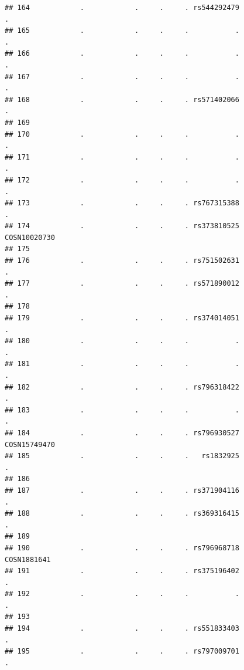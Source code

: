 \documentclass[
]{article}
\begin{document}
\begin{verbatim}
## 164            .            .     .     . rs544292479                        .
## 165            .            .     .     .           .                        .
## 166            .            .     .     .           .                        .
## 167            .            .     .     .           .                        .
## 168            .            .     .     . rs571402066                        .
## 169                                                                           
## 170            .            .     .     .           .                        .
## 171            .            .     .     .           .                        .
## 172            .            .     .     .           .                        .
## 173            .            .     .     . rs767315388                        .
## 174            .            .     .     . rs373810525             COSN10020730
## 175                                                                           
## 176            .            .     .     . rs751502631                        .
## 177            .            .     .     . rs571890012                        .
## 178                                                                           
## 179            .            .     .     . rs374014051                        .
## 180            .            .     .     .           .                        .
## 181            .            .     .     .           .                        .
## 182            .            .     .     . rs796318422                        .
## 183            .            .     .     .           .                        .
## 184            .            .     .     . rs796930527             COSN15749470
## 185            .            .     .     .   rs1832925                        .
## 186                                                                           
## 187            .            .     .     . rs371904116                        .
## 188            .            .     .     . rs369316415                        .
## 189                                                                           
## 190            .            .     .     . rs796968718              COSN1881641
## 191            .            .     .     . rs375196402                        .
## 192            .            .     .     .           .                        .
## 193                                                                           
## 194            .            .     .     . rs551833403                        .
## 195            .            .     .     . rs797009701                        .

\end{verbatim}
\end{document}
